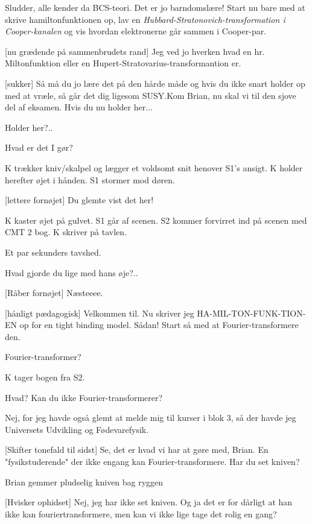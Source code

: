 \documentclass[a4paper,11pt]{article}
\begin{document}
\begin{sketch}
 Sludder, alle kender da BCS-teori. Det er jo barndomslære! Start nu bare med at skrive hamiltonfunktionen op, lav en \emph{Hubbard-Stratonovich-transformation i Cooper-kanalen} og vis hvordan elektronerne går sammen i Cooper-par.

[nu grædende på sammenbrudets rand] Jeg ved jo hverken hvad en hr. Miltonfunktion eller en Hupert-Stratovarius-transformantion er.

[sukker] Så må du jo lære det på den hårde måde og hvis du ikke snart holder op med at vræle,
så går det dig ligesom SUSY.Kom Brian, nu skal vi til den sjove del af eksamen. Hvis du nu holder her...

 Holder her?..

 Hvad er det I gør?

\scene K trækker kniv/skalpel og lægger et voldsomt snit henover S1's ansigt. K holder herefter øjet i hånden. S1 stormer mod døren.

[lettere fornøjet] Du glemte vist det her!

\scene K kaster øjet på gulvet. S1 går af scenen. S2 kommer forvirret ind på scenen med CMT 2 bog. K skriver på tavlen.

\scene Et par sekunders tavshed.

 Hvad gjorde du lige med hans øje?..


[Råber fornøjet] Næsteeee.


[hånligt pædagogisk] Velkommen til. Nu skriver jeg HA-MIL-TON-FUNK-TION-EN op for en tight binding model. Sådan! Start så med at Fourier-transformere den.

 Fourier-transformer?

K tager bogen fra S2.

 Hvad? Kan du ikke Fourier-transformerer?

 Nej, for jeg havde også glemt at melde mig til kurser i blok 3, så der havde jeg Universets Udvikling og Fødevarefysik.

[Skifter tonefald til sidst] Se, det er hvad vi har at gøre med, Brian. En "fysikstuderende" der ikke engang kan Fourier-transformere. Har du set kniven?

\scene Brian gemmer pludselig kniven bag ryggen

[Hvisker ophidset] Nej, jeg har ikke set kniven. Og ja det er for dårligt at han ikke kan fouriertransformere, men kan vi ikke lige tage det rolig en gang?


\end{sketch}
\end{document}
